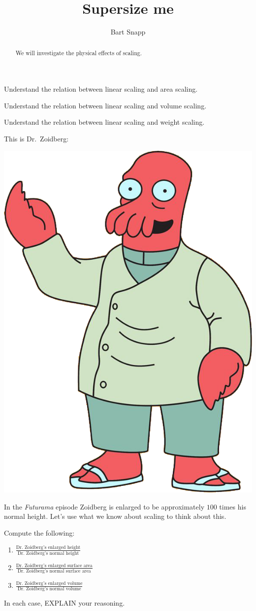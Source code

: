 \documentclass[handout,nooutcomes,noauthor]{ximera}
\title{Supersize me}
\author{Bart Snapp}
\begin{document}
\begin{abstract}
  We will investigate the physical effects of scaling.
\end{abstract}
\maketitle


\begin{listOutcomes}
\item Understand the relation between linear scaling and area scaling.
\item Understand the relation between linear scaling and volume scaling.
\item  Understand the relation between linear scaling and weight scaling. 
\end{listOutcomes}

This is Dr.\ Zoidberg:

\begin{center}
  \includegraphics[width=.3\textwidth]{zoidberg.png}
\end{center}

In the \textit{Futurama} episode  Zoidberg is enlarged to be
approximately $100$ times his normal height. Let's use what we know
about scaling to think about this.

\mynewpage


 
\begin{question}
  Compute the following:
    \begin{enumerate}
    \item $\frac{\text{Dr.\ Zoidberg's enlarged
        height}}{\text{Dr.\ Zoidberg's normal height}}$
    \item $\frac{\text{Dr.\ Zoidberg's enlarged
        surface area}}{\text{Dr.\ Zoidberg's normal surface area}}$
    \item $\frac{\text{Dr.\ Zoidberg's enlarged
        volume}}{\text{Dr.\ Zoidberg's normal volume}}$
    \end{enumerate}
    In each case, EXPLAIN your reasoning.
\end{question}
\mynewpage
\end{document}
